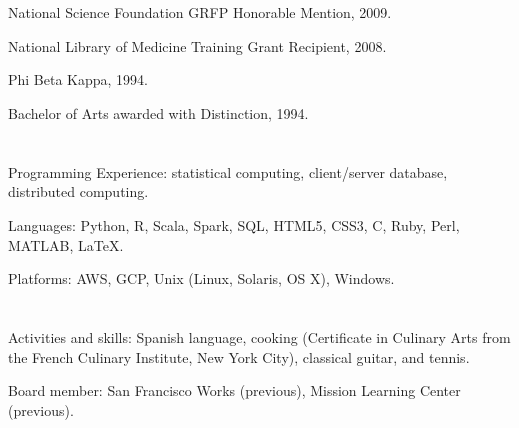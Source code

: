 \begin{resume}


\section{}
\begin{listitems}
\item National Science Foundation GRFP Honorable Mention, 2009.
\item National Library of Medicine Training Grant Recipient, 2008.
\item Phi Beta Kappa, 1994.
\item Bachelor of Arts awarded with Distinction, 1994.
\end{listitems}

\section{}
\begin{listitems}
\item{Programming Experience: statistical computing, client/server database, distributed computing.}
\item{Languages:  Python, R, Scala, Spark, SQL, HTML5, CSS3, C, Ruby, Perl, MATLAB, \LaTeX{}.}
\item{Platforms: AWS, GCP, Unix (Linux, Solaris, OS X), Windows.}
\end{listitems}

\section{}
\begin{listitems}
\item Activities and skills: Spanish language, cooking (Certificate
  in Culinary Arts from the French Culinary Institute, New York City), classical
  guitar, and tennis.
\item Board member: San Francisco Works (previous), Mission Learning
  Center (previous).
\end{listitems}



\end{resume}

